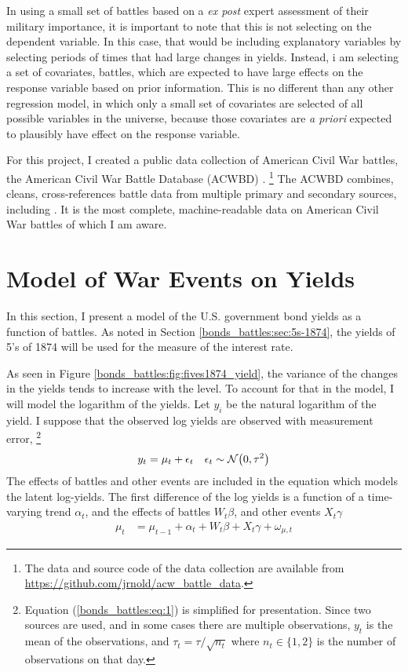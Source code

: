 In using a small set of battles based on a \textit{ex post} expert assessment of their military importance, it is important to note that this is not selecting on the dependent variable.
In this case, that would be including explanatory variables by selecting periods of times that had large changes in yields.
Instead, i am selecting a set of covariates, \ie{} battles, which are expected to have large effects on the response variable based on prior information.
This is no different than any other regression model, in which only a small set of covariates are selected of all possible variables in the universe, because those covariates are \textit{a priori} expected to plausibly have effect on the response variable.

For this project, I created a public data collection of American Civil War battles, the American Civil War Battle Database (ACWBD) \parencite{Arnold2015b}.%
\footnote{The data and source code of the data collection are available from \url{https://github.com/jrnold/acw_battle_data}.}
The ACWBD combines, cleans, cross-references battle data from multiple primary and secondary sources, including \textcites{Phisterer1883}{Livermore1900}{Bodart1908}{dyer1908_war_rebel}{KennedyConservation1998}{CWSAC1993}{cwsac2012}.
It is the most complete, machine-readable data on American Civil War battles of which I am aware.



\section{Model of War Events on Yields}
\label{bonds_battles:sec:model-war-events}

In this section, I present a model of the U.S. government bond yields as a function of battles.
As noted in Section \ref{bonds_battles:sec:5s-1874}, the yields of 5's of 1874 will be used for the measure of the interest rate.

As seen in Figure \ref{bonds_battles:fig:fives1874_yield}, the variance of the changes in the yields tends to increase with the level. 
To account for that in the model, I will model the logarithm of the yields.
Let $y_{i}$ be the natural logarithm of the yield.
I suppose that the observed log yields are observed with measurement error,%
\footnote{Equation (\ref{bonds_battles:eq:1}) is simplified for presentation. Since two sources are used, and in some cases there are multiple observations, $y_{t}$ is the mean of the observations, and $\tau_{t} = \tau / \sqrt{n_{t}}$ where $n_{t} \in \{1, 2\}$ is the number of observations on that day.}
\begin{align}
  \label{bonds_battles:eq:6}
  y_{t} &= \mu_{t} + \epsilon_{t} & \epsilon_{t} \sim \mathcal{N}\mathopen{}\left(0, \tau^{2}\right)\mathclose{}
\end{align}
The effects of battles and other events are included in the equation which models the latent log-yields.
The first difference of the log yields is a function of a time-varying trend $\alpha_{t}$, and the effects of battles $W_{t} \beta$, and other events $X_{t} \gamma$ 
\begin{align}
  \label{bonds_battles:eq:7}
  \mu_{t} &= \mu_{t - 1} + \alpha_{t} + W_{t} \beta + X_{t} \gamma + \omega_{\mu,t}
\end{align}

